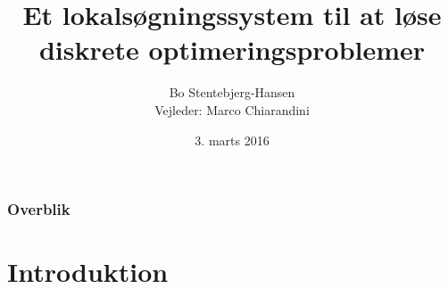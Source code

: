\documentclass[smaller]{beamer}
\title[]{Et lokalsøgningssystem til at løse diskrete 
optimeringsproblemer}%
\author[]{Bo Stentebjerg-Hansen\\{ \scriptsize Vejleder: Marco Chiarandini}}
\institute[IMADA] 
{
Syddansk Universitet \\ %
\medskip
Institut for Matematik og Datalogi
}
\date{3. marts 2016} %
\begin{document}
\begin{frame}
\titlepage %

\end{frame}

\begin{frame}
\frametitle{Overblik} %
\tableofcontents %
\end{frame}


\section{Introduktion} %
\end{document}

